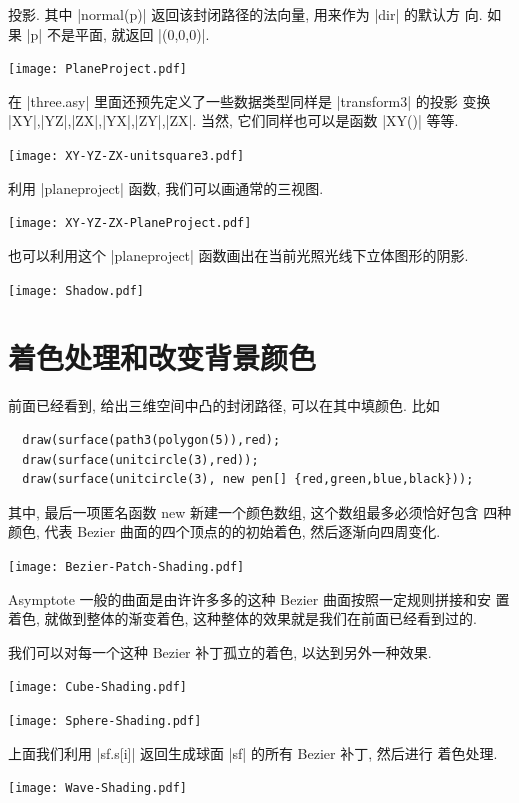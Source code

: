 \documentclass[nofonts,CJKnormalspaces]{ctexbook}[2009/05/20]
\begin{document}
投影. 其中 |normal(p)| 返回该封闭路径的法向量, 用来作为 |dir| 的默认方
向. 如果 |p| 不是平面, 就返回 |(0,0,0)|.
\begin{center}\texttt{[image: PlaneProject.pdf]}\end{center}%

在 |three.asy| 里面还预先定义了一些数据类型同样是 |transform3| 的投影
变换 |XY|,|YZ|,|ZX|,|YX|,|ZY|,|ZX|. 当然, 它们同样也可以是函数 |XY()|
等等.
\begin{center}\texttt{[image: XY-YZ-ZX-unitsquare3.pdf]}\end{center}%

利用 |planeproject| 函数, 我们可以画通常的三视图.
\begin{center}\texttt{[image: XY-YZ-ZX-PlaneProject.pdf]}\end{center}%


也可以利用这个 |planeproject| 函数画出在当前光照光线下立体图形的阴影.
\begin{center}\texttt{[image: Shadow.pdf]}\end{center}%


\section{着色处理和改变背景颜色}
前面已经看到, 给出三维空间中凸的封闭路径, 可以在其中填颜色. 比如
\begin{lstlisting}
  draw(surface(path3(polygon(5)),red);
  draw(surface(unitcircle(3),red));
  draw(surface(unitcircle(3), new pen[] {red,green,blue,black}));
\end{lstlisting}
其中, 最后一项匿名函数 new 新建一个颜色数组, 这个数组最多必须恰好包含
四种颜色, 代表 Bezier 曲面的四个顶点的的初始着色, 然后逐渐向四周变化.
\begin{center}\texttt{[image: Bezier-Patch-Shading.pdf]}\end{center}%

Asymptote 一般的曲面是由许许多多的这种 Bezier 曲面按照一定规则拼接和安
置着色, 就做到整体的渐变着色, 这种整体的效果就是我们在前面已经看到过的.

我们可以对每一个这种 Bezier 补丁孤立的着色, 以达到另外一种效果.
\begin{center}\texttt{[image: Cube-Shading.pdf]}\end{center}%

\begin{center}\texttt{[image: Sphere-Shading.pdf]}\end{center}%

上面我们利用 |sf.s[i]| 返回生成球面 |sf| 的所有 Bezier 补丁, 然后进行
着色处理.
\begin{center}\texttt{[image: Wave-Shading.pdf]}\end{center}%

\end{document}
